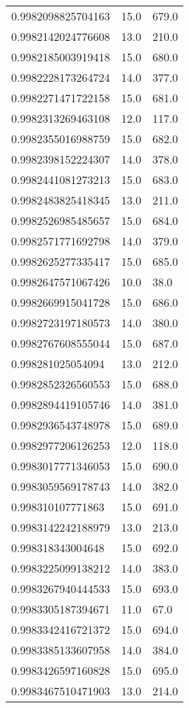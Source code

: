 \begin{center}
\begin{supertabular}[H]{p{0.30\textwidth}p{0.05\textwidth}p{0.05\textwidth}}
0.9982098825704163 & 15.0 & 679.0 \\ 
0.9982142024776608 & 13.0 & 210.0 \\ 
0.9982185003919418 & 15.0 & 680.0 \\ 
0.9982228173264724 & 14.0 & 377.0 \\ 
0.9982271471722158 & 15.0 & 681.0 \\ 
0.9982313269463108 & 12.0 & 117.0 \\ 
0.9982355016988759 & 15.0 & 682.0 \\ 
0.9982398152224307 & 14.0 & 378.0 \\ 
0.9982441081273213 & 15.0 & 683.0 \\ 
0.9982483825418345 & 13.0 & 211.0 \\ 
0.9982526985485657 & 15.0 & 684.0 \\ 
0.9982571771692798 & 14.0 & 379.0 \\ 
0.9982625277335417 & 15.0 & 685.0 \\ 
0.9982647571067426 & 10.0 & 38.0 \\ 
0.9982669915041728 & 15.0 & 686.0 \\ 
0.9982723197180573 & 14.0 & 380.0 \\ 
0.9982767608555044 & 15.0 & 687.0 \\ 
0.998281025054094 & 13.0 & 212.0 \\ 
0.9982852326560553 & 15.0 & 688.0 \\ 
0.9982894419105746 & 14.0 & 381.0 \\ 
0.9982936543748978 & 15.0 & 689.0 \\ 
0.9982977206126253 & 12.0 & 118.0 \\ 
0.9983017771346053 & 15.0 & 690.0 \\ 
0.9983059569178743 & 14.0 & 382.0 \\ 
0.998310107771863 & 15.0 & 691.0 \\ 
0.9983142242188979 & 13.0 & 213.0 \\ 
0.998318343004648 & 15.0 & 692.0 \\ 
0.9983225099138212 & 14.0 & 383.0 \\ 
0.9983267940444533 & 15.0 & 693.0 \\ 
0.9983305187394671 & 11.0 & 67.0 \\ 
0.9983342416721372 & 15.0 & 694.0 \\ 
0.9983385133607958 & 14.0 & 384.0 \\ 
0.9983426597160828 & 15.0 & 695.0 \\ 
0.9983467510471903 & 13.0 & 214.0 \\ 

\end{supertabular}
\end{center}
